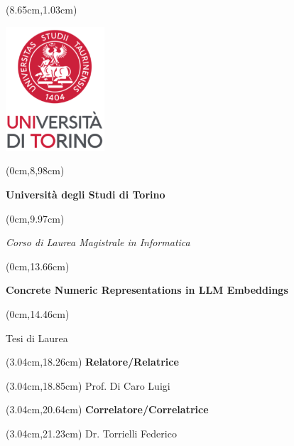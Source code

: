 \frontmatter

\thispagestyle{empty}

\begingroup
\TahomaFont


\begin{textblock*}{4cm}(8.65cm,1.03cm)
	\centerline {\includegraphics[width=3.67cm]{src/res/unito_logo.png}}
\end{textblock*}


\begin{textblock*}{21cm}(0cm,8,98cm)
	\fontsize{18}{22}\selectfont
	\centerline {\textbf{ Universit\`a degli Studi di Torino}}
\end{textblock*}
\begin{textblock*}{21cm}(0cm,9.97cm)
	\fontsize{18}{22}\selectfont
	\centerline {\textit{Corso di Laurea Magistrale in Informatica}}
\end{textblock*}


\begin{textblock*}{21cm}(0cm,13.66cm)
	\fontsize{20}{24}\selectfont
	\centerline  {\textbf{Concrete Numeric Representations in LLM Embeddings​}}
\end{textblock*}
\begin{textblock*}{21cm}(0cm,14.46cm)
	\fontsize{18}{22}\selectfont
	\centerline{\Large {Tesi di Laurea}}
\end{textblock*}



\fontsize{14}{17}\selectfont

\begin{textblock*}{8cm}(3.04cm,18.26cm)
	\noindent
	\textbf{Relatore/Relatrice}
\end{textblock*}
\begin{textblock*}{8cm}(3.04cm,18.85cm)
	\noindent
	Prof. Di Caro Luigi
\end{textblock*}

\begin{textblock*}{8cm}(3.04cm,20.64cm)
	\noindent
	\textbf{Correlatore/Correlatrice}
\end{textblock*}
\begin{textblock*}{8cm}(3.04cm,21.23cm)
	\noindent
	Dr. Torrielli Federico
\end{textblock*}


